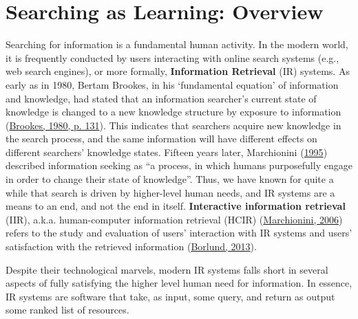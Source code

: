 \documentclass[letterpaper, nobind]{templates/ociamthesis}
\begin{document}
\hypertarget{sec-intro-overview}{%
\section{Searching as Learning: Overview}\label{sec-intro-overview}}

Searching for information is a fundamental human activity. In the modern world, it is frequently conducted by users interacting with online search systems (e.g., web search engines), or more formally, \textbf{Information Retrieval} (IR) systems.
As early as in 1980, Bertam Brookes, in his `fundamental equation' of information and knowledge, had stated that an information searcher's current state of knowledge is changed to a new knowledge structure by exposure to information (\protect\hyperlink{ref-brookes1980foundations}{Brookes, 1980, p. 131}).
This indicates that searchers acquire new knowledge in the search process, and the same information will have different effects on different searchers' knowledge states.
Fifteen years later, Marchionini (\protect\hyperlink{ref-marchionini1995information}{1995}) described information seeking as ``a process, in which humans purposefully engage in order to change
their state of knowledge''.
Thus, we have known for quite a while that search is driven by higher-level human needs, and IR systems are a means to an end, and not the end in itself.
\textbf{Interactive information retrieval} (IIR), a.k.a. human-computer information retrieval (HCIR) (\protect\hyperlink{ref-marchionini2006toward}{Marchionini, 2006}) refers to the study and evaluation of users' interaction with IR systems and users' satisfaction with the retrieved information (\protect\hyperlink{ref-borlund2013interactive}{Borlund, 2013}).

Despite their technological marvels, modern IR systems falls short in several aspects of fully satisfying the higher level human need for information.
In essence, IR systems are software that take, as input, some query, and return as output some ranked list of resources.
\end{document}
